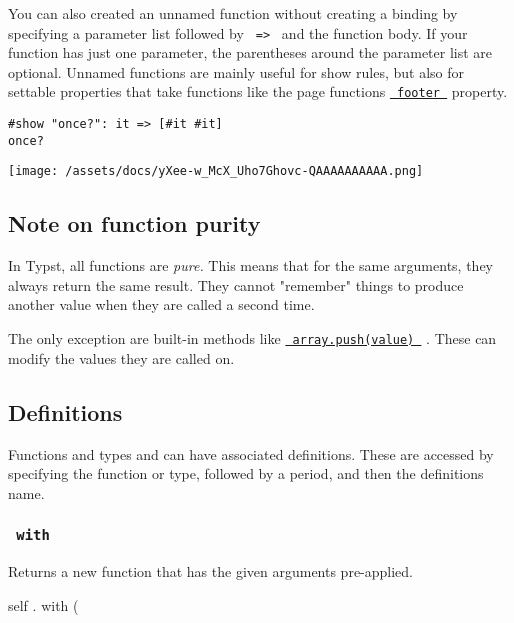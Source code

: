 You can also created an unnamed function without creating a binding by
specifying a parameter list followed by \texttt{\ =\textgreater{}\ } and
the function body. If your function has just one parameter, the
parentheses around the parameter list are optional. Unnamed functions
are mainly useful for show rules, but also for settable properties that
take functions like the page function\textquotesingle s
\href{/docs/reference/layout/page/\#parameters-footer}{\texttt{\ footer\ }}
property.

\begin{verbatim}
#show "once?": it => [#it #it]
once?
\end{verbatim}

\texttt{[image: /assets/docs/yXee-w\_McX\_Uho7Ghovc-QAAAAAAAAAA.png]}

\subsection{Note on function purity}\label{note-on-function-purity}

In Typst, all functions are \emph{pure.} This means that for the same
arguments, they always return the same result. They cannot "remember"
things to produce another value when they are called a second time.

The only exception are built-in methods like
\href{/docs/reference/foundations/array/\#definitions-push}{\texttt{\ array.push(value)\ }}
. These can modify the values they are called on.

\subsection{\texorpdfstring{{ Definitions
}}{ Definitions }}\label{definitions}

\label{definitions-tooltip}
Functions and types and can have associated definitions. These are
accessed by specifying the function or type, followed by a period, and
then the definition\textquotesingle s name.

\subsubsection{\texorpdfstring{\texttt{\ with\ }}{ with }}\label{definitions-with}

Returns a new function that has the given arguments pre-applied.

self { . } { with } (

